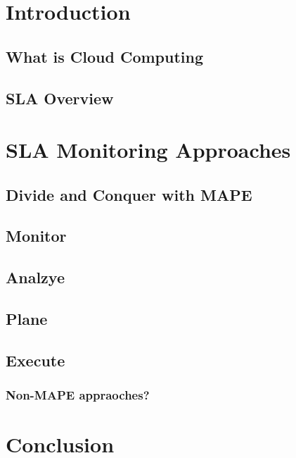 \documentclass{llncs}
\begin{document}
\maketitle              %

\section{Introduction}

\subsection{What is Cloud Computing}

\subsection{SLA Overview}

\section{SLA Monitoring Approaches}

\subsection{Divide and Conquer with MAPE}

\subsection{Monitor}

\subsection{Analzye}

\subsection{Plane}

\subsection{Execute}

\subsubsection{Non-MAPE appraoches?}

\section{Conclusion}
\end{document}
